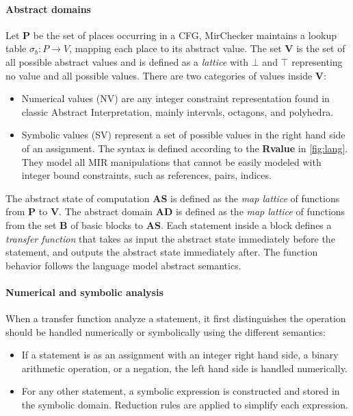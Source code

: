 \documentclass{article}
\begin{document}
\paragraph{Abstract domains}
Let \textbf{P} be the set of places  occurring in a CFG, MirChecker maintains a lookup table $\sigma_b : P \rightarrow V$, mapping each place 
to its abstract value. The set \textbf{V} is the set of all possible abstract values and is defined as a 
\textit{lattice} with $\bot$ and $\top$ representing no value and all possible values. There are two categories of values inside \textbf{V}: 
\begin{itemize}
    \item Numerical values (NV) are any integer constraint representation found in 
    classic Abstract Interpretation, mainly intervals, octagons, and polyhedra.
    \item Symbolic values (SV) represent a set of possible values in the right hand side of an assignment. The syntax is defined
    according to the \textbf{Rvalue} in \autoref{fig:lang}. They model  all MIR manipulations that cannot be easily modeled 
    with integer bound constraints, such as references, pairs, indices.
\end{itemize}

The abstract state of computation \textbf{AS} is defined as the \textit{map lattice} of functions from 
\textbf{P} to \textbf{V}. The abstract domain \textbf{AD} is defined as the \textit{map lattice} of functions from the set \textbf{B} of basic blocks to 
\textbf{AS}. Each statement inside a block defines a \textit{transfer function}
that takes as input the abstract state  immediately before the statement, and outputs the abstract state immediately after. The function behavior follows 
the language model abstract semantics.
\paragraph{Numerical and symbolic analysis}
When a transfer function analyze a statement, it first distinguishes 
 the operation should be handled numerically or symbolically  using the different semantics:
\begin{itemize}
    \item If a statement is as an assignment with an integer right hand side, a binary arithmetic operation, or a negation, the left 
    hand side is handled numerically.
    \item For any other statement, a symbolic expression is constructed and stored in the symbolic domain. Reduction rules are applied 
    to simplify each expression.
\end{itemize}
\end{document}

